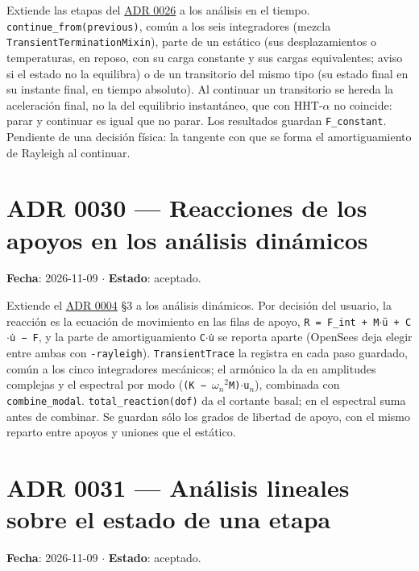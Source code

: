 \documentclass[11pt,oneside]{report}
\begin{document}
Extiende las etapas del \hyperref[adr:0026]{ADR 0026} a los análisis en el tiempo. \texttt{continue\_\allowbreak{}from(previous)}, común a los seis integradores (mezcla \texttt{TransientTerminationMixin}), parte de un estático (sus desplazamientos o temperaturas, en reposo, con su carga constante y sus cargas equivalentes; aviso si el estado no la equilibra) o de un transitorio del mismo tipo (su estado final en su instante final, en tiempo absoluto). Al continuar un transitorio se hereda la aceleración final, no la del equilibrio instantáneo, que con HHT-\ensuremath{\alpha} no coincide: parar y continuar es igual que no parar. Los resultados guardan \texttt{F\_constant}. Pendiente de una decisión física: la tangente con que se forma el amortiguamiento de Rayleigh al continuar.

\section{ADR 0030 --- Reacciones de los apoyos en los análisis dinámicos}
\label{adr:0030}

\textbf{Fecha}: 2026-11-09 \ensuremath{\cdot} \textbf{Estado}: aceptado.

Extiende el \hyperref[adr:0004]{ADR 0004} §3 a los análisis dinámicos. Por decisión del usuario, la reacción es la ecuación de movimiento en las filas de apoyo, \texttt{R = F\_\allowbreak{}int + M\ensuremath{\cdot}ü + C\ensuremath{\cdot}u̇ − F}, y la parte de amortiguamiento \texttt{C\ensuremath{\cdot}u̇} se reporta aparte (OpenSees deja elegir entre ambas con \texttt{-rayleigh}). \texttt{TransientTrace} la registra en cada paso guardado, común a los cinco integradores mecánicos; el armónico la da en amplitudes complejas y el espectral por modo (\texttt{(K − \ensuremath{\omega}\ensuremath{_{n}}\ensuremath{^{2}}M)\ensuremath{\cdot}u\ensuremath{_{n}}}), combinada con \texttt{combine\_modal}. \texttt{total\_\allowbreak{}reaction(dof)} da el cortante basal; en el espectral suma antes de combinar. Se guardan sólo los grados de libertad de apoyo, con el mismo reparto entre apoyos y uniones que el estático.

\section{ADR 0031 --- Análisis lineales sobre el estado de una etapa}
\label{adr:0031}

\textbf{Fecha}: 2026-11-09 \ensuremath{\cdot} \textbf{Estado}: aceptado.
\end{document}
